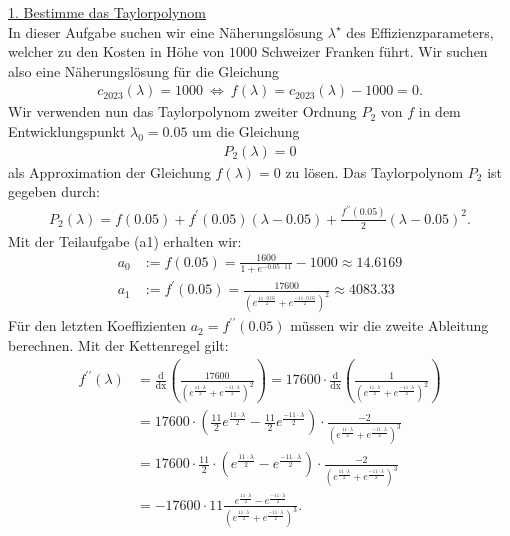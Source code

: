\underline{1. Bestimme das Taylorpolynom}\\
In dieser Aufgabe suchen wir eine Näherungslösung $\lambda^\star$ des Effizienzparameters, welcher zu den Kosten in Höhe von $1000$ Schweizer Franken führt. Wir suchen also eine Näherungslösung für die Gleichung
\begin{align*}
	c_{2023}(\lambda) = 1000
	\ \Leftrightarrow \
	f(\lambda) = c_{2023}(\lambda ) - 1000 = 0.
\end{align*}
Wir verwenden nun das Taylorpolynom zweiter Ordnung $P_2$ von $f$ in dem Entwicklungspunkt $\lambda_0 = 0.05$ um die Gleichung
\begin{align*}
	P_2(\lambda) = 0
\end{align*}
als Approximation der Gleichung $f(\lambda) = 0$ zu lösen. Das Taylorpolynom $P_2$ ist gegeben durch:
\begin{align*}
	P_2(\lambda)
	=
	f(0.05) 
	+ f^\prime(0.05) (\lambda - 0.05)
	+ \frac{f^{\prime \prime}(0.05)}{2} (\lambda - 0.05)^2.
\end{align*}
Mit der Teilaufgabe (a1)  erhalten wir:
\begin{align*}
	a_0 &:= f(0.05) 
	= 
	\frac{1600}{1 + e^{- 0.05\cdot 11}} - 1000
	\approx  14.6169\\
	a_1 &:= f^\prime(0.05)
	=
	\frac{17600}{\left( e^{\frac{11 \cdot 0.05}{2}} + e^{\frac{-11 \cdot 0.05}{2}} \right)^2}
	\approx 4083.33
\end{align*}
Für den letzten Koeffizienten $a_2 = f^{\prime \prime}(0.05)$ müssen wir die zweite Ableitung berechnen. Mit der Kettenregel gilt:
\begin{align*}
	f^{\prime \prime}(\lambda)
	&=
	\frac{\mathrm{d}}{\mathrm{dx}}
	\left(
	\frac{17600}{\left( e^{\frac{11 \cdot \lambda}{2}} + e^{\frac{-11 \cdot \lambda}{2}} \right)^2}
	\right)
	=
	17600 \cdot 
	\frac{\mathrm{d}}{\mathrm{dx}}
	\left(
	\frac{1}{\left( e^{\frac{11 \cdot \lambda}{2}} + e^{\frac{-11 \cdot \lambda}{2}} \right)^2}
	\right)\\
	&=
	17600\cdot
	\left( 
		\frac{11}{2}  e^{\frac{11 \cdot \lambda}{2}} 
		- \frac{11}{2} e^{\frac{-11 \cdot \lambda}{2}}
	\right)
	\cdot 
	\frac{-2}{\left( e^{\frac{11 \cdot \lambda}{2}} + e^{\frac{-11 \cdot \lambda}{2}} \right)^3}\\
	&=
	17600\cdot \frac{11}{2} \cdot 
	\left( 
	  e^{\frac{11 \cdot \lambda}{2}} 
	-  e^{\frac{-11 \cdot \lambda}{2}}
	\right)
	\cdot 
	\frac{-2}{\left( e^{\frac{11 \cdot \lambda}{2}} + e^{\frac{-11 \cdot \lambda}{2}} \right)^3}\\
	&=
	-17600 \cdot 11 
		\frac{e^{\frac{11 \cdot \lambda}{2}} 
			-  e^{\frac{-11 \cdot \lambda}{2}}
	}{
		\left( e^{\frac{11 \cdot \lambda}{2}} + e^{\frac{-11 \cdot \lambda}{2}} \right)^3
	}.
\end{align*}
